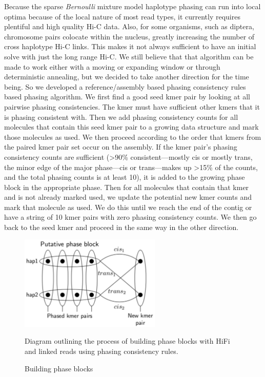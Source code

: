 {\par{
Because the sparse \textit{Bernoulli} mixture model haplotype phasing can run into local optima because of the local nature of most read types, it currently requires plentiful and high quality Hi-C data. Also, for some organisms, such as diptera, chromosome pairs colocate within the nucleus\cite{somaticpairing}, greatly increasing the number of cross haplotype Hi-C links. This makes it not always sufficient to have an initial solve with just the long range Hi-C. We still believe that that algorithm can be made to work either with a moving or expanding window or through deterministic annealing, but we decided to take another direction for the time being. So we developed a reference/assembly based phasing consistency rules based phasing algorithm. We first find a good seed kmer pair by looking at all pairwise phasing consistencies. The kmer must have sufficient other kmers that it is phasing consistent with. Then we add phasing consistency counts for all molecules that contain this seed kmer pair to a growing data structure and mark those molecules as used. We then proceed according to the order that kmers from the paired kmer pair set occur on the assembly. If the kmer pair's phasing consistency counts are sufficient (>90\% consistent---mostly cis or mostly trans, the minor edge of the major phase---cis or trans---makes up >15\% of the counts, and the total phasing counts is at least 10), it is added to the growing phase block in the appropriate phase. Then for all molecules that contain that kmer and is not already marked used, we update the potential new kmer counts and mark that molecule as used. We do this until we reach the end of the contig or have a string of 10 kmer pairs with zero phasing consistency counts. We then go back to the seed kmer and proceed in the same way in the other direction.
}

\begin{figure}[htbp!]
\caption{Building phase blocks}
\label{figure:phaseblocks}
\begin{centering}
\includegraphics[width=0.6\textwidth]{phaseblockbuilding.png}
\par{Diagram outlining the process of building phase blocks with HiFi and linked reads using phasing consistency rules. }
\end{centering}
\end{figure}

}

